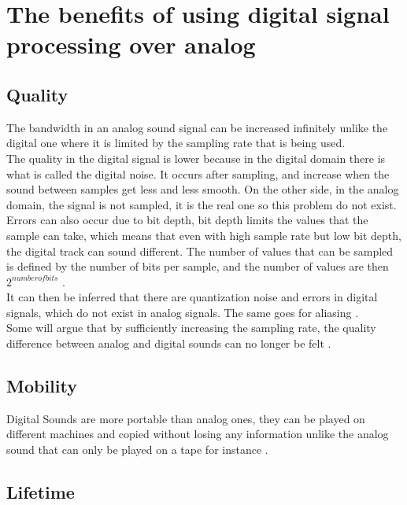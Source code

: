 \section{The benefits of using digital signal processing over analog}
\subsection{Quality}

The bandwidth in an analog sound signal can be increased infinitely unlike the digital one where it is limited by the sampling rate that is being used. \\

The quality in the digital signal is  lower because in the digital domain there is what is called the digital noise. It occurs after sampling, and increase when the sound between samples get less and less smooth. On the other side, in the analog domain, the signal is not sampled, it is the real one so this problem do not exist. Errors can also occur due to bit depth, bit depth limits the values that the sample can take, which means that even with high sample rate but low bit depth, the digital track can sound different. The number of values that can be sampled is defined by the number of bits per sample, and the number of values are then $2^{number of bits}$ \citep{analog_quality}.\\
It can then be inferred that there are quantization noise and errors in digital signals, which do not exist in analog signals. The same goes for aliasing \citep{analog_aliasing}. \\

Some will argue that by sufficiently increasing the sampling rate, the quality difference between analog and digital sounds can no longer be felt \citep{analog_storage}.

\subsection{Mobility}

Digital Sounds are more portable than analog ones, they can be played on different machines and copied without losing any information unlike the analog sound that can only be played on a tape for instance \citep{analog_quality}. 

\subsection{Lifetime}

